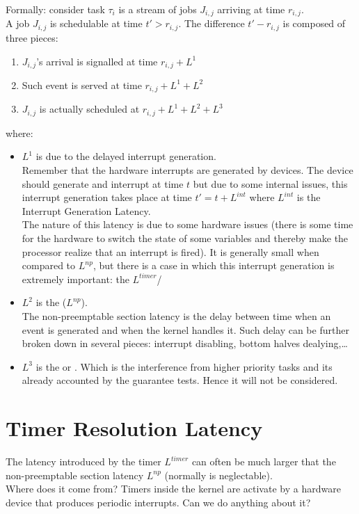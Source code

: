 Formally: consider task $\tau_i$ is a stream of jobs $J_{i,j}$ arriving at time $r_{i,j}$.\\
A job $J_{i,j}$ is schedulable at time $t' > r_{i,j}$. The difference $t' - r_{i,j}$ is composed of three pieces:
\begin{enumerate}
    \item $J_{i,j}$'s arrival is signalled at time $r_{i,j} + L^1$
    \item Such event is served at time $r_{i,j} + L^1 + L^2$
    \item $J_{i,j}$ is actually scheduled at $r_{i,j} + L^1 + L^2 + L^3$
\end{enumerate}
where:
\begin{itemize}
    \item $L^1$ is due to the delayed interrupt generation.\\
    Remember that the hardware interrupts are generated by devices. The device should generate and interrupt at time $t$ but due to some internal issues, this interrupt generation takes place at time $t' = t + L^{int}$ where $L^{int}$ is the Interrupt Generation Latency.\\
    The nature of this latency is due to some hardware issues (there is some time for the hardware to switch the state of some variables and thereby make the processor realize that an interrupt is fired). It is generally small when compared to $L^{np}$, but there is a case in which this interrupt generation is extremely important: the  $L^{timer}$/
    \item $L^2$ is the  ($L^{np}$).\\
    The non-preemptable section latency is the delay between time when an event is generated and when the kernel handles it. Such delay can be further broken down in several pieces: interrupt disabling, bottom halves dealying,\dots\\
    \item $L^3$ is the  or . Which is the interference from higher priority tasks and its already accounted by the guarantee tests. Hence it will not be considered.
\end{itemize}

\section{Timer Resolution Latency}
The latency introduced by the timer $L^{timer}$ can often be much larger that the non-preemptable section latency $L^{np}$ (normally is neglectable).\\
Where does it come from? Timers inside the kernel are activate by a hardware device that produces periodic interrupts. Can we do anything about it?

